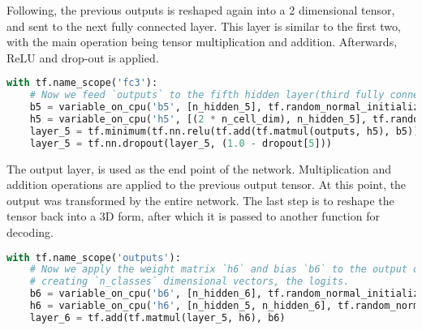 Following, the previous outputs is reshaped again into a 2 dimensional tensor, and sent to the next fully connected layer. 
This layer is similar to the first two, with the main operation being tensor multiplication and addition.
Afterwards, ReLU and drop-out is applied.
\begin{lstlisting}[language=Python, flexiblecolumns=true, caption=Third fully connected layer.]
with tf.name_scope('fc3'):
    # Now we feed `outputs` to the fifth hidden layer(third fully connected layer) with clipped RELU activation and dropout
    b5 = variable_on_cpu('b5', [n_hidden_5], tf.random_normal_initializer(stddev=b5_stddev))
    h5 = variable_on_cpu('h5', [(2 * n_cell_dim), n_hidden_5], tf.random_normal_initializer(stddev=h5_stddev))
    layer_5 = tf.minimum(tf.nn.relu(tf.add(tf.matmul(outputs, h5), b5)), relu_clip)
    layer_5 = tf.nn.dropout(layer_5, (1.0 - dropout[5]))
\end{lstlisting}
The output layer, is used as the end point of the network.
Multiplication and addition operations are applied to the previous output tensor. 
At this point, the output was  transformed by the entire network. 
The last step is to reshape the tensor back into a 3D form, after which it is passed to another function for decoding.
\begin{lstlisting}[language=Python, flexiblecolumns=true, caption=Output layer.]
with tf.name_scope('outputs'):
    # Now we apply the weight matrix `h6` and bias `b6` to the output of `layer_5`
    # creating `n_classes` dimensional vectors, the logits.
    b6 = variable_on_cpu('b6', [n_hidden_6], tf.random_normal_initializer(stddev=b6_stddev))
    h6 = variable_on_cpu('h6', [n_hidden_5, n_hidden_6], tf.random_normal_initializer(stddev=h6_stddev))
    layer_6 = tf.add(tf.matmul(layer_5, h6), b6)
\end{lstlisting}
